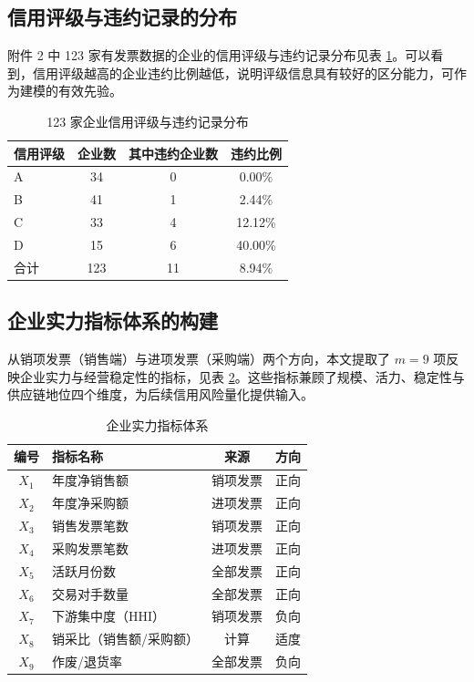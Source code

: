 \documentclass[12pt]{ctexart}
\begin{document}
\subsection{信用评级与违约记录的分布}

附件 2 中 123 家有发票数据的企业的信用评级与违约记录分布见表 \ref{tab:rating}。可以看到，信用评级越高的企业违约比例越低，说明评级信息具有较好的区分能力，可作为建模的有效先验。

\begin{table}[H]
\centering
\caption{123 家企业信用评级与违约记录分布}
\label{tab:rating}
\small
\begin{tabular}{lccc}
\toprule
\textbf{信用评级} & \textbf{企业数} & \textbf{其中违约企业数} & \textbf{违约比例} \\
\midrule
A & 34 & 0 & 0.00\% \\
B & 41 & 1 & 2.44\% \\
C & 33 & 4 & 12.12\% \\
D & 15 & 6 & 40.00\% \\
\midrule
合计 & 123 & 11 & 8.94\% \\
\bottomrule
\end{tabular}
\end{table}

\subsection{企业实力指标体系的构建}

从销项发票（销售端）与进项发票（采购端）两个方向，本文提取了 $m=9$ 项反映企业实力与经营稳定性的指标，见表 \ref{tab:index}。这些指标兼顾了规模、活力、稳定性与供应链地位四个维度，为后续信用风险量化提供输入。

\begin{table}[H]
\centering
\caption{企业实力指标体系}
\label{tab:index}
\small
\begin{tabular}{clcl}
\toprule
\textbf{编号} & \textbf{指标名称} & \textbf{来源} & \textbf{方向} \\
\midrule
$X_1$ & 年度净销售额 & 销项发票 & 正向 \\
$X_2$ & 年度净采购额 & 进项发票 & 正向 \\
$X_3$ & 销售发票笔数 & 销项发票 & 正向 \\
$X_4$ & 采购发票笔数 & 进项发票 & 正向 \\
$X_5$ & 活跃月份数 & 全部发票 & 正向 \\
$X_6$ & 交易对手数量 & 全部发票 & 正向 \\
$X_7$ & 下游集中度（HHI） & 销项发票 & 负向 \\
$X_8$ & 销采比（销售额/采购额） & 计算 & 适度 \\
$X_9$ & 作废/退货率 & 全部发票 & 负向 \\
\bottomrule
\end{tabular}
\end{table}
\end{document}
